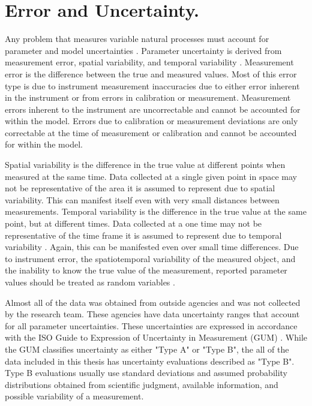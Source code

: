\section{Error and Uncertainty.}
\label{sec:ErrorAndUncertainty}

Any problem that measures variable natural processes must account for parameter and model uncertainties \parencite{vicens1975}.  Parameter uncertainty is derived from measurement error, spatial variability, and temporal variability \parencite{herschy2002}.  Measurement error is the difference between the true and measured values.  Most of this error type is due to instrument measurement inaccuracies due to either error inherent in the instrument or from errors in calibration or measurement.  Measurement errors inherent to the instrument are uncorrectable and cannot be accounted for within the model.  Errors due to calibration or measurement deviations are only correctable at the time of measurement or calibration and cannot be accounted for within the model.

Spatial variability is the difference in the true value at different points when measured at the same time.  Data collected at a single given point in space may not be representative of the area it is assumed to represent due to spatial variability.  This can manifest itself even with very small distances between measurements.  Temporal variability is the difference in the true value at the same point, but at different times.  Data collected at a one time may not be representative of the time frame it is assumed to represent due to temporal variability \parencite{Gates1996}.  Again, this can be manifested even over small time differences.  Due to instrument error, the spatiotemporal variability of the measured object, and the inability to know the true value of the measurement, reported parameter values should be treated as random variables \parencite{haan1989,haan2002}.

Almost all of the data was obtained from outside agencies and was not collected by the research team.  These agencies have data uncertainty ranges that account for all parameter uncertainties.  These uncertainties are expressed in accordance with the ISO Guide to Expression of Uncertainty in Measurement (GUM) \parencite{gum2008}.  While the GUM classifies uncertainty as either "Type A" or "Type B", the all of the data included in this thesis has uncertainty evaluations described as "Type B".  Type B evaluations usually use standard deviations and assumed probability distributions obtained from scientific judgment, available information, and possible variability of a measurement.


